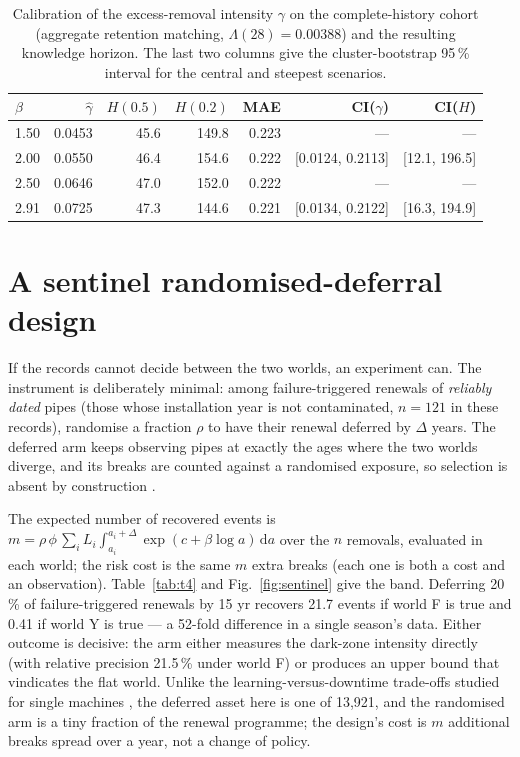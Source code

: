 \documentclass[review,12pt,authoryear]{elsarticle}
\begin{document}
\begin{table}[!t]
\centering
\footnotesize
\caption{Calibration of the excess-removal intensity $\gamma$ on the
complete-history cohort (aggregate retention matching,
$\Lambda(28)=0.00388$) and the resulting knowledge horizon. The last two
columns give the cluster-bootstrap 95\,\% interval for the central and
steepest scenarios.}
\label{tab:gamma}
\begin{tabular}{lrrrrrr}
\toprule
$\beta$ & $\hat\gamma$ & $H(0.5)$ & $H(0.2)$ &
MAE & CI($\gamma$) & CI($H$) \\
\midrule
1.50 & 0.0453 & 45.6 & 149.8 & 0.223 & --- & --- \\
2.00 & 0.0550 & 46.4 & 154.6 & 0.222 & [0.0124, 0.2113] & [12.1, 196.5] \\
2.50 & 0.0646 & 47.0 & 152.0 & 0.222 & --- & --- \\
2.91 & 0.0725 & 47.3 & 144.6 & 0.221 & [0.0134, 0.2122] & [16.3, 194.9] \\
\bottomrule
\end{tabular}
\end{table}

\section{A sentinel randomised-deferral design}
\label{sec:sentinel}

If the records cannot decide between the two worlds, an experiment can. The
instrument is deliberately minimal: among failure-triggered renewals of
\emph{reliably dated} pipes (those whose installation year is not
contaminated, $n=121$ in these records), randomise a fraction $\rho$
to have their renewal deferred by $\Delta$ years. The deferred arm keeps
observing pipes at exactly the ages where the two worlds diverge, and its
breaks are counted against a randomised exposure, so selection is absent by
construction \citep{Mantel1959,Cox1972}.

The expected number of recovered events is
$m = \rho\,\phi\,\sum_i L_i\!\int_{a_i}^{a_i+\Delta}\!
\exp(c+\beta\log a)\,\mathrm{d}a$ over the $n$ removals, evaluated in each
world; the risk cost is the same $m$ extra breaks (each one is both a cost
and an observation). Table~\ref{tab:t4} and Fig.~\ref{fig:sentinel} give the
band. Deferring 20\,\% of failure-triggered renewals by 15 yr
recovers 21.7 events if world F is true and 0.41 if world Y is true ---
a 52-fold difference in a single season's data. Either outcome is
decisive: the arm either measures the dark-zone intensity directly (with
relative precision 21.5\,\% under world F) or produces an upper bound
that vindicates the flat world. Unlike the learning-versus-downtime
trade-offs studied for single machines \citep{Drent2020,BarlowProschan1965},
the deferred asset here is one of 13,921, and the randomised arm is a
tiny fraction of the renewal programme; the design's cost is $m$ additional
breaks spread over a year, not a change of policy.
\end{document}
